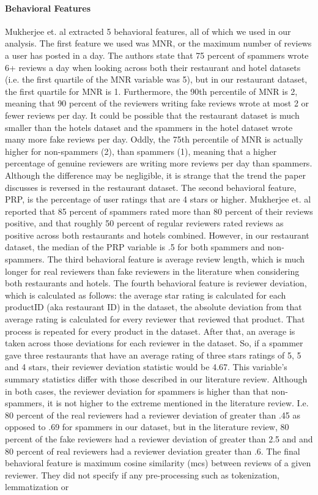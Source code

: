 \documentclass[man, floatsintext, 10pt]{apa6}
\begin{document}
\vspace{2mm}

\paragraph{Behavioral Features} Mukherjee et. al extracted 5 behavioral features, all of which we used in our analysis. The first feature we used was MNR, or the maximum number of reviews a user has posted in a day. The authors state that 75 percent of spammers wrote 6+ reviews a day when looking across both their restaurant and hotel datasets (i.e. the first quartile of the MNR variable was 5), but in our restaurant dataset, the first quartile for MNR is 1. Furthermore, the 90th percentile of MNR is 2, meaning that 90 percent of the reviewers writing fake reviews wrote at most 2 or fewer reviews per day. It could be possible that the restaurant dataset is much smaller than the hotels dataset and the spammers in the hotel dataset wrote many more fake reviews per day. Oddly, the 75th percentile of MNR is actually higher for non-spammers (2), than spammers (1), meaning that a higher percentage of genuine reviewers are writing more reviews per day than spammers. Although the difference may be negligible, it is strange that the trend the paper discusses is reversed in the restaurant dataset. The second behavioral feature, PRP, is the percentage of user ratings that are 4 stars or higher. Mukherjee et. al reported that 85 percent of spammers rated more than 80 percent of their reviews positive, and that roughly 50 percent of regular reviewers rated reviews as positive across both restaurants and hotels combined. However, in our restaurant dataset, the median of the PRP variable is .5 for both spammers and non-spammers. The third behavioral feature is average review length, which is much longer for real reviewers than fake reviewers in the literature when considering both restaurants and hotels. The fourth behavioral feature is reviewer deviation, which is calculated as follows: the average star rating is calculated for each productID (aka restaurant ID) in the dataset, the absolute deviation from that average rating is calculated for every reviewer that reviewed that product. That process is repeated for every product in the dataset. After that, an average is taken across those deviations for each reviewer in the dataset. So, if a spammer gave three restaurants that have an average rating of three stars ratings of 5, 5 and 4 stars, their reviewer deviation statistic would be 4.67. This variable's summary statistics differ with those described in our literature review. Although in both cases, the reviewer deviation for spammers is higher than that non-spammers, it is not higher to the extreme mentioned in the literature review. I.e. 80 percent of the real reviewers had a reviewer deviation of greater than .45 as opposed to .69 for spammers in our dataset, but in the literature review, 80 percent of the fake reviewers had a reviewer deviation of greater than 2.5 and and 80 percent of real reviewers had a reviewer deviation greater than .6. The final behavioral feature is maximum cosine similarity (mcs) between reviews of a given reviewer. They did not specify if any pre-processing such as tokenization, lemmatization or 
\end{document}
